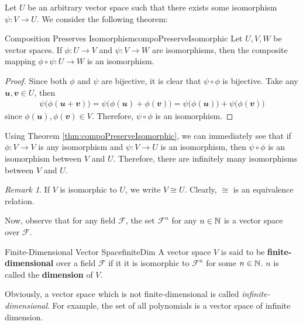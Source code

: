 \documentclass[math, code]{amznotes}
\theoremstyle{remark}
\newtheorem*{remark}{Remark}
\begin{document}
Let $U$ be an arbitrary vector space such that there exists some isomorphism $\psi \colon V \to U$. We consider the following theorem:
\begin{thmbox}{Composition Preserves Isomorphism}{compoPreserveIsomorphic}
    Let $U, V, W$ be vector spaces. If $\phi \colon U \to V$ and $\psi \colon V \to W$ are isomorphisms, then the composite mapping $\phi \circ \psi \colon U \to W$ is an isomorphism.
    \tcblower
    \begin{proof}
        Since both $\phi$ and $\psi$ are bijective, it is clear that $\psi \circ \phi$ is bijective. Take any $\mathbfit{u}, \mathbfit{v} \in U$, then
        \begin{align*}
            \psi\bigl(\phi(\mathbfit{u + v})\bigr) = \psi\bigl(\phi(\mathbfit{u}) + \phi(\mathbfit{v})\bigr) = \psi\bigl(\phi(\mathbfit{u})\bigr) + \psi\bigl(\phi(\mathbfit{v})\bigr)
        \end{align*}
        since $\phi(\mathbfit{u}), \phi(\mathbfit{v}) \in V$. Therefore, $\psi \circ \phi$ is an isomorphism.
    \end{proof}
\end{thmbox}
Using Theorem \ref{thm:compoPreserveIsomorphic}, we can immediately see that if $\phi \colon V \to V$ is any isomorphism and $\psi \colon V \to U$ is an isomorphism, then $\psi \circ \phi$ is an isomorphism between $V$ and $U$. Therefore, there are infinitely many isomorphisms between $V$ and $U$.
\begin{notebox}
    \begin{remark}
        If $V$ is isomorphic to $U$, we write $V \cong U$. Clearly, $\cong$ is an equivalence relation.
    \end{remark}
\end{notebox}

Now, observe that for any field $\mathcal{F}$, the set $\mathcal{F}^n$ for any $n \in \mathbb{N}$ is a vector space over $\mathcal{F}$.
\begin{dfnbox}{Finite-Dimensional Vector Space}{finiteDim}
    A vector space $V$ is said to be {\color{red} \textbf{finite-dimensional}} over a field $\mathcal{F}$ if it it is isomorphic to $\mathcal{F}^n$ for some $n \in \mathbb{N}$. $n$ is called the {\color{red} \textbf{dimension}} of $V$.
\end{dfnbox}
Obviously, a vector space which is not finite-dimensional is called \textit{infinite-dimensional}. For example, the set of all polynomials is a vector space of infinite dimension.
\end{document}
